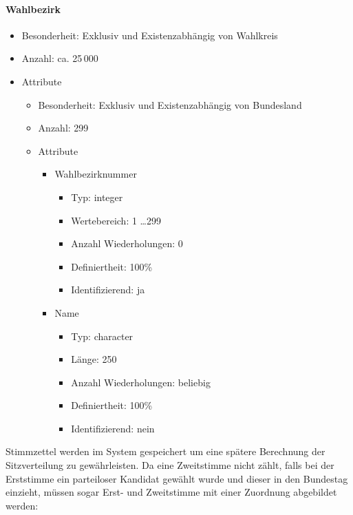 \documentclass[a4paper]{article}
\begin{document}
\paragraph{Wahlbezirk}
\begin{itemize}
\item Besonderheit: Exklusiv und Existenzabhängig von Wahlkreis
\item Anzahl: ca. 25\,000
\item Attribute
\begin{itemize}
\item Besonderheit: Exklusiv und Existenzabhängig von Bundesland
\item Anzahl: 299
\item Attribute
	\begin{itemize}
	\item Wahlbezirknummer
		\begin{itemize}
		\item Typ: integer
		\item Wertebereich: 1 \ldots 299
		\item Anzahl Wiederholungen: 0
		\item Definiertheit: 100\%
		\item Identifizierend: ja
		\end{itemize}
	\item Name
		\begin{itemize}
		\item Typ: character
		\item Länge: 250
		\item Anzahl Wiederholungen: beliebig
		\item Definiertheit: 100\%
		\item Identifizierend: nein
		\end{itemize}
	\end{itemize}
\end{itemize}
\end{itemize}

Stimmzettel werden im System gespeichert um eine spätere Berechnung der Sitzverteilung zu gewährleisten. Da eine Zweitstimme nicht zählt, falls bei der Erststimme ein parteiloser Kandidat gewählt wurde und dieser in den Bundestag einzieht, müssen sogar Erst- und Zweitstimme mit einer Zuordnung abgebildet werden:
\end{document}
